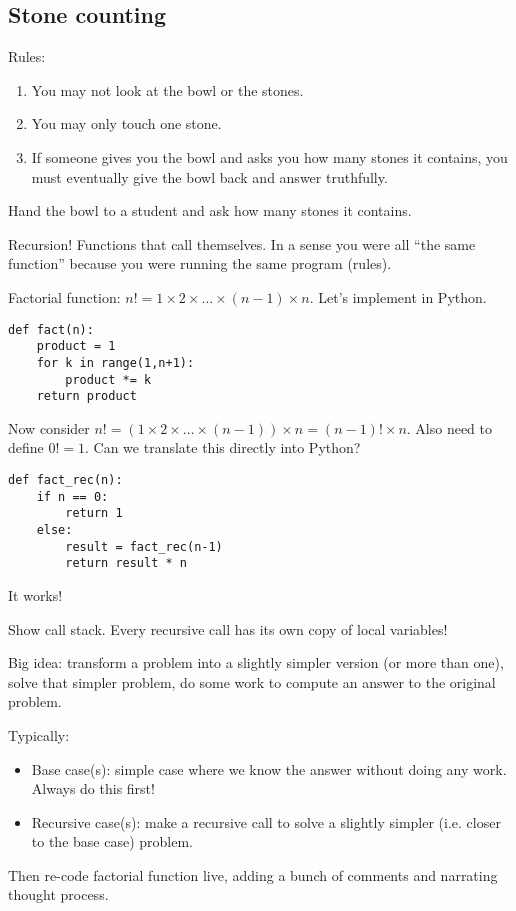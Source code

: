 \documentclass{article}
\begin{document}
\subsection*{Stone counting}

Rules:
\begin{enumerate}
\item You may not look at the bowl or the stones.
\item You may only touch one stone.
\item If someone gives you the bowl and asks you how many stones it
  contains, you must eventually give the bowl back and answer
  truthfully.
\end{enumerate}
Hand the bowl to a student and ask how many stones it contains.

Recursion!  Functions that call themselves.  In a sense you were all
``the same function'' because you were running the same program
(rules).

Factorial function: $n! = 1 \times 2 \times \dots \times (n-1) \times
n$.  Let's implement in Python.
\begin{verbatim}
def fact(n):
    product = 1
    for k in range(1,n+1):
        product *= k
    return product
\end{verbatim}
Now consider $n! = (1 \times 2 \times \dots \times (n-1)) \times n =
(n-1)! \times n$.  Also need to define $0! = 1$.  Can we translate
this directly into Python?
\begin{verbatim}
def fact_rec(n):
    if n == 0:
        return 1
    else:
        result = fact_rec(n-1)
        return result * n
\end{verbatim}
It works!

Show call stack.  Every recursive call has its own copy of local
variables!

Big idea: transform a problem into a slightly simpler version (or more
than one), solve that simpler problem, do some work to compute an
answer to the original problem.

Typically:
\begin{itemize}
\item Base case(s): simple case where we know the answer without doing
  any work.  Always do this first!
\item Recursive case(s): make a recursive call to solve a slightly
  simpler (i.e. closer to the base case) problem.
\end{itemize}

Then re-code factorial function live, adding a bunch of comments and
  narrating thought process.
\end{document}
